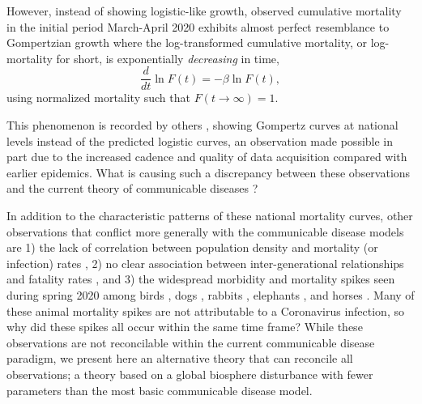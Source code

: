 \documentclass{article}
\newcommand{\insertSmallPdfFig}[3]{
  \begin{figure}[h]
  \centering
  \texttt{[image: \#1.pdf]}
  \caption{#2}
  \label{fig:#1}
  \end{figure}
}
\begin{document}
However, instead of showing logistic-like growth, observed cumulative mortality in the initial period March-April 2020 exhibits almost perfect resemblance to Gompertzian growth \cite{Gompertz1825,bajzer1997mathematical} where the log-transformed cumulative mortality, or log-mortality for short, is exponentially \emph{decreasing} in time,
\begin{equation}
\label{eq:GompertzODEsimple}
\frac{d}{dt}\ln{F(t)} = -\beta\ln{F(t)},
\end{equation} 
using normalized mortality such that $F(t\rightarrow\infty) = 1$.

This phenomenon is recorded by others \cite{Ohnishi2020,Rypdal2020,Catala2020,rodrigues2020monte,Levitt2020}, showing Gompertz curves at national levels instead of the predicted logistic curves, an observation made possible in part due to the increased cadence and quality of data acquisition compared with earlier epidemics. What is causing such a discrepancy between these observations and the current theory of communicable diseases \cite{castro2020turning}? 

In addition to the characteristic patterns of these national mortality curves, other observations that conflict more generally with the communicable disease models are 1) the lack of correlation between population density and mortality (or infection) rates \cite{Hamidi2020,Hamidi2020a,Carozzi2020,liu2020emerging,medica2020covid,khavarian2021high,barak2021urban}, 2) no clear association between inter-generational relationships and fatality rates \cite{Arpino2020}, and 3) the widespread morbidity and mortality spikes seen during spring 2020 among birds \cite{Fischer2021}, dogs \cite{PeriseBarrios2021}, rabbits \cite{Duff2020,Hu2020,Fukui2021}, elephants \cite{Aarde2021}, and horses \cite{Kambayashi2021,King2020,Lu2020,CastilloOlivares2020}. Many of these animal mortality spikes are not attributable to a Coronavirus infection, so why did these spikes all occur within the same time frame? While these observations are not reconcilable within the current communicable disease paradigm, we present here an alternative theory that can reconcile all observations; a theory based on a global biosphere disturbance with fewer parameters than the most basic communicable disease model. 
\end{document}
